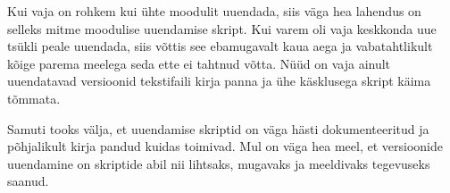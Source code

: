 \documentclass[12pt]{report}
\begin{document}
Kui vaja on rohkem kui ühte moodulit uuendada, siis väga hea lahendus on selleks mitme moodulise uuendamise skript. Kui varem oli vaja keskkonda uue tsükli peale uuendada, siis võttis see ebamugavalt kaua aega ja vabatahtlikult kõige parema meelega seda ette ei tahtnud võtta. Nüüd on vaja ainult uuendatavad versioonid tekstifaili kirja panna ja ühe käsklusega skript käima tõmmata. 

Samuti tooks välja, et uuendamise skriptid on väga hästi dokumenteeritud ja põhjalikult kirja pandud kuidas toimivad. Mul on väga hea meel, et versioonide uuendamine on skriptide abil nii lihtsaks, mugavaks ja meeldivaks tegevuseks saanud.
\end{document}
